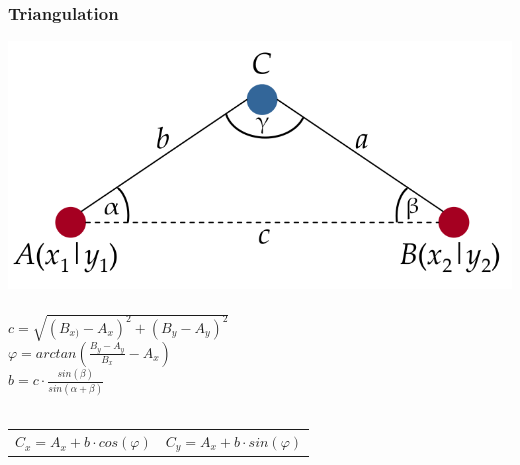 \begin{frame}
  \frametitle{Triangulation}

  \begin{center}
    \includegraphics[scale=0.2]{img/triang}\\~\\

    $c = \sqrt{(B_{x)} - A_{x})^2 + (B_{y} - A_{y})^2}$\\
    $\varphi = arctan(\frac{B_{y} - A_{y}}{B_{x}} - A_{x})$\\
    $b = c \cdot \frac{sin(\beta)}{sin(\alpha + \beta)}$\\~\\

     \begin{tabular}{rr}
       $C_{x} = A_{x} + b \cdot cos(\varphi)$ & $C_{y} = A_{x} + b \cdot sin(\varphi)$ \\ 
     \end{tabular}
  \end{center}
\end{frame}

